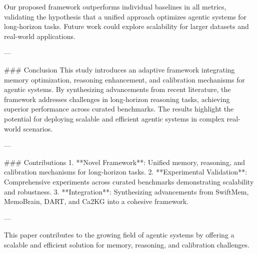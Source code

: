 Our proposed framework outperforms individual baselines in all metrics, validating the hypothesis that a unified approach optimizes agentic systems for long-horizon tasks. Future work could explore scalability for larger datasets and real-world applications.

---

### Conclusion
This study introduces an adaptive framework integrating memory optimization, reasoning enhancement, and calibration mechanisms for agentic systems. By synthesizing advancements from recent literature, the framework addresses challenges in long-horizon reasoning tasks, achieving superior performance across curated benchmarks. The results highlight the potential for deploying scalable and efficient agentic systems in complex real-world scenarios.

---

### Contributions
1. **Novel Framework**:
   Unified memory, reasoning, and calibration mechanisms for long-horizon tasks.
2. **Experimental Validation**:
   Comprehensive experiments across curated benchmarks demonstrating scalability and robustness.
3. **Integration**:
   Synthesizing advancements from SwiftMem, MemoBrain, DART, and Ca2KG into a cohesive framework.

--- 

This paper contributes to the growing field of agentic systems by offering a scalable and efficient solution for memory, reasoning, and calibration challenges.